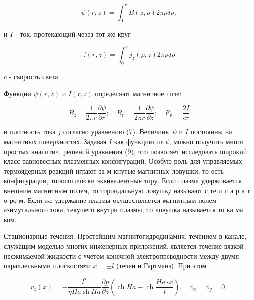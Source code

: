 \documentclass[10pt]{article}
\begin{document}
\[

\psi(r, z)=\int_{0}^{r} B(z, \rho) 2 \pi \rho d \rho,

\]



и $I$ - ток, протекающий через тот же круг



\[

I(r, z)=\int_{0}^{r} j_{z}(\rho, z) 2 \pi \rho d \rho

\]



$c$ - скорость света.



Функции $\psi(r, z)$ и $I(r, z)$ определяют магнитное поле:



\[

B_{z}=\frac{1}{2 \pi r} \frac{\partial \psi}{\partial r} ; \quad B_{r}=\frac{1}{2 \pi r} \frac{\partial \psi}{\partial z} ; \quad B_{\vartheta}=\frac{2 I}{c r}

\]



и плотность тока $j$ согласно уравнению (7). Величины $\psi$ и $I$ постоянны на магнитных поверхностях. Задавая $I$ как функцию от $\psi$, можно получить много простых аналитич. решений уравнения (9), что позволяет исследовать широкий класс равновесных плазменных конфигураций. Особую роль для управляемых термоядерных реакций играют за м кнутые магнитные ловушки, то есть конфигурации, топологически эквивалентные тору. Если плазма удерживается внешним магнитным полем, то тороидальную ловушку называют с те л л а р а т о ро м. Если же удержание плазмы осуществляется магнитным полем азимутального тока, текущего внутри плазмы, то ловушка называется то ка ма ком.



Стационарные течения. Простейшим магнитогидродинамич. течением в канале, служащим моделью многих инженерных приложений, является течение вязкой несжимаемой жидкости с учетом конечной электропроводности между двумя параллельными плоскостями $x= \pm l$ (течен и Гартмана). При этом



\[

v_{z}(x)=-\frac{l^{2}}{\eta H a \operatorname{sh} H a} \frac{\partial p}{\partial z}\left(\operatorname{ch} H a-\operatorname{ch} \frac{H a \cdot x}{l}\right), \quad v_{x}=v_{y}=0,

\]
\end{document}
